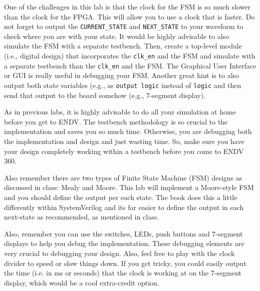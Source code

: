 \documentclass{article}
\begin{document}
One of the challenges in this lab is that the clock for the FSM is so
much slower than the clock for the FPGA.  This will allow you to use a
clock that is faster.  Do not forget to output the
\verb!CURRENT_STATE! and \verb!NEXT_STATE! to your waveform to check
where you are with your state.
It would be highly advisable
to also simulate the FSM with a separate testbench.  Then, create a
top-level module (i.e., digital design) that incorporates the
\verb!clk_en! and the FSM and simulate with a separate testbench than
the \verb!clk_en! and the FSM.  The Graphical User Interface or GUI
is really useful in debugging your FSM. Another great hint
is to also output both
state variables (e.g., as \verb!output logic! instead of \verb!logic! and then send
that output to the board somehow (e.g., $7$-segment display).

As in previous labs, it is highly advisable to do all your simulation
at home before you get to ENDV.  The testbench methodology is so
crucial to the implementation and saves you so much time.  Otherwise,
you are debugging both the implementation and design and just wasting
time.  So, make sure you have your design completely working within a
testbench before you come to ENDV 360.

Also remember there are two types of Finite State Machine (FSM)
designs as discussed in class:
Mealy and Moore.  This lab will implement a Moore-style FSM and you
should define the output per each state.  The book does this a little
differently within SystemVerilog and its far
easier to define the
output in each next-state as recommended, as mentioned in class.

Also, remember you can use the switches, LEDs, push buttons and
$7$-segment displays to help you debug the implementation.  These
debugging elements are very crucial to debugging your design.  Also,
feel free to play with the clock divider to speed or slow things
down.  If you get tricky, you could easily output the time (i.e. in
ms or seconds) that the
clock is working at on the $7$-segment display, which would be a cool
extra-credit option.  



\end{document}
